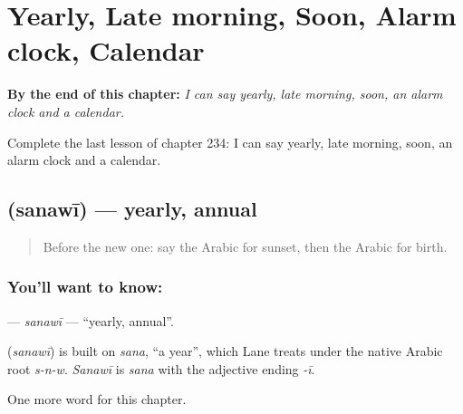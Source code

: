
\chapter{Yearly, Late morning, Soon, Alarm clock, Calendar}
\label{ch:ar-yearly-late-morning-soon-alarm-clock-calendar}

\begin{chapteropening}
\textbf{By the end of this chapter:} \emph{I can say yearly, late morning, soon, an alarm clock and a calendar.}

Complete the last lesson of chapter 234: I can say yearly, late morning, soon, an alarm clock and a calendar.
\end{chapteropening}

\section[\texorpdfstring{\ar{سنوي} (sanawī)}{سنوي (sanawī)}]{ (sanawī) — yearly, annual}

\label{lesson:AR-C234-sanawi}



\begin{quote}
Before the new one: say the Arabic for sunset, then the Arabic for birth.
\end{quote}

\subsection*{You'll want to know: }
\textbf{} — \emph{sanawī} — \textquotedblleft{}yearly, annual\textquotedblright{}.

\begin{cousinweb}
\textbf{} (\emph{sanawī}) is built on \emph{sana}, \textquotedblleft{}a year\textquotedblright{}, which Lane treats under the native Arabic root \emph{s-n-w}. \emph{Sanawī} is \emph{sana} with the adjective ending \emph{-ī}.
\end{cousinweb}

\begin{grammarlens}[title={What you've built}]
One more word for this chapter.
\end{grammarlens}

